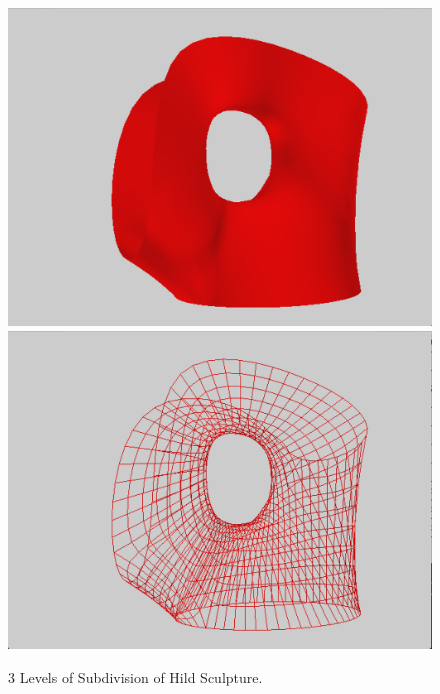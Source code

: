 \documentclass[12pt]{article}
\begin{document}
\begin{figure}[h!]
  \centering
    \includegraphics[width=\textwidth]{Hild3}
    \includegraphics[width=\textwidth]{Hild3w}
  \caption{3 Levels of Subdivision of Hild Sculpture.} \label{figure:Hild3}
\end{figure}
\end{document}
